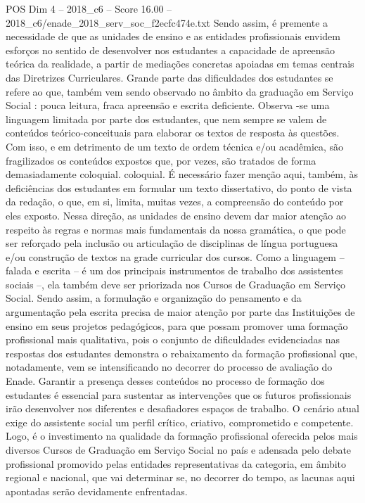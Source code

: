 \begin{textsample}{POS Dim 4 – 2018\_c6 – Score 16.00 – 2018\_c6/enade\_2018\_serv\_soc\_f2ecfc474e.txt}
Sendo assim, é premente a necessidade de que as unidades de ensino e as entidades profissionais envidem esforços no sentido de desenvolver nos estudantes a capacidade de apreensão teórica da realidade, a partir de mediações concretas apoiadas em temas centrais das Diretrizes Curriculares.
Grande parte das dificuldades dos estudantes se refere ao que, também vem sendo observado no âmbito da graduação em Serviço Social : pouca leitura, fraca apreensão e escrita deficiente.
Observa -se uma linguagem limitada por parte dos estudantes, que nem sempre se valem de conteúdos teórico-conceituais para elaborar os textos de resposta às questões.
Com isso, e em detrimento de um texto de ordem técnica e/ou acadêmica, são fragilizados os conteúdos expostos que, por vezes, são tratados de forma demasiadamente coloquial. coloquial.
É necessário fazer menção aqui, também, às deficiências dos estudantes em formular um texto dissertativo, do ponto de vista da redação, o que, em si, limita, muitas vezes, a compreensão do conteúdo por eles exposto.
Nessa direção, as unidades de ensino devem dar maior atenção ao respeito às regras e normas mais fundamentais da nossa gramática, o que pode ser reforçado pela inclusão ou articulação de disciplinas de língua portuguesa e/ou construção de textos na grade curricular dos cursos.
Como a linguagem – falada e escrita – é um dos principais instrumentos de trabalho dos assistentes sociais –, ela também deve ser priorizada nos Cursos de Graduação em Serviço Social.
Sendo assim, a formulação e organização do pensamento e da argumentação pela escrita precisa de maior atenção por parte das Instituições de ensino em seus projetos pedagógicos, para que possam promover uma formação profissional mais qualitativa, pois o conjunto de dificuldades evidenciadas nas respostas dos estudantes demonstra o rebaixamento da formação profissional que, notadamente, vem se intensificando no decorrer do processo de avaliação do Enade.
Garantir a presença desses conteúdos no processo de formação dos estudantes é essencial para sustentar as intervenções que os futuros profissionais irão desenvolver nos diferentes e desafiadores espaços de trabalho.
O cenário atual exige do assistente social um perfil crítico, criativo, comprometido e competente.
Logo, é o investimento na qualidade da formação profissional oferecida pelos mais diversos Cursos de Graduação em Serviço Social no país e adensada pelo debate profissional promovido pelas entidades representativas da categoria, em âmbito regional e nacional, que vai determinar se, no decorrer do tempo, as lacunas aqui apontadas serão devidamente enfrentadas.

\end{textsample}
